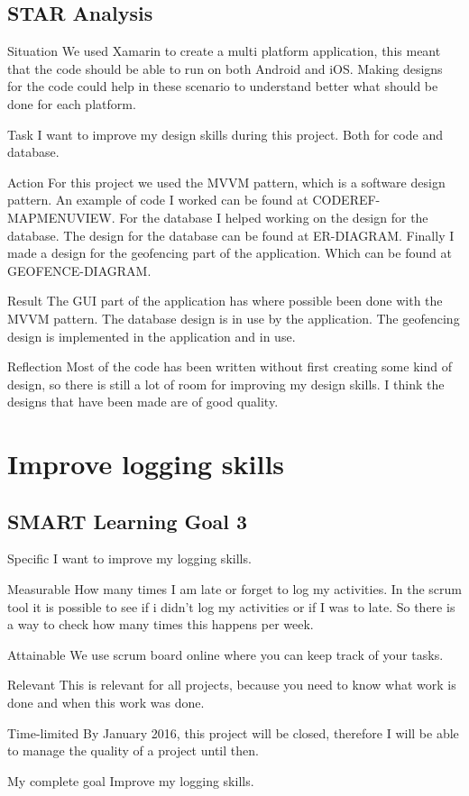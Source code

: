 \documentclass[12pt]{article}
\begin{document}
	\subsection{STAR Analysis}
	\begin{STAR}
	    \item[Situation] We used Xamarin to create a multi platform application, this meant that the code should be able to run on both Android and iOS. Making designs for the code could help in these scenario to understand better what should be done for each platform.
	    \item[Task] I want to improve my design skills during this project. Both for code and database.
	    \item[Action] For this project we used the MVVM pattern, which is a software design pattern. An example of code I worked can be found at CODEREF-MAPMENUVIEW. For the database I helped working on the design for the database. The design for the database can be found at ER-DIAGRAM. Finally I made a design for the geofencing part of the application. Which can be found at GEOFENCE-DIAGRAM.
	    \item[Result] The GUI part of the application has where possible been done with the MVVM pattern. The database design is in use by the application. The geofencing design is implemented in the application and in use.
	    \item[Reflection] Most of the code has been written without first creating some kind of design, so there is still a lot of room for improving my design skills. I think the designs that have been made are of good quality.
	\end{STAR}
	
	\section{Improve logging skills}
	
	\subsection{SMART Learning Goal 3}
	\begin{SMART}
	    \item[Specific] I want to improve my logging skills.
	    \item[Measurable] How many times I am late or forget to log my activities. In the scrum tool it is possible to see if i didn't log my activities or if I was to late. So there is a way to check how many times this happens per week.
	    \item[Attainable] We use scrum board online where you can keep track of your tasks.
	    \item[Relevant] This is relevant for all projects, because you need to know what work is done and when this work was done.
	    \item[Time-limited] By January 2016, this project will be closed, therefore I will be able to manage the quality of a project until then.
	    \item[My complete goal] Improve my logging skills.
	\end{SMART}
	
\end{document}
